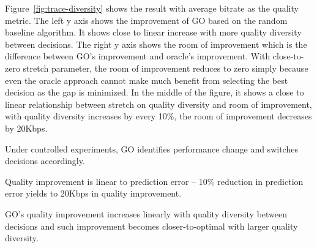 Figure~\ref{fig:trace-diversity} shows the result with average bitrate as the quality metric. The left y axis shows the improvement of GO based on the random baseline algorithm. It shows close to linear increase with more quality diversity between decisions. 
The right y axis shows the room of improvement which is the difference between GO's improvement and oracle's improvement. With close-to-zero stretch parameter, the room of improvement reduces to zero simply because even the oracle approach cannot make much benefit from selecting the best decision as the gap is minimized. 
In the middle of the figure, it shows a close to linear relationship between stretch on quality diversity and room of improvement, with quality diversity increases by every 10\%, the room of improvement decreases by 20Kbps. 



\begin{packedenumerate}
	\item Under controlled experiments, GO identifies performance change and switches decisions accordingly.
	\item Quality improvement is linear to prediction error -- 10\% reduction in prediction error yields to 20Kbps in quality improvement.
	\item GO's quality improvement increases linearly with quality diversity between decisions and such improvement becomes closer-to-optimal with larger quality diversity.
\end{packedenumerate}






































